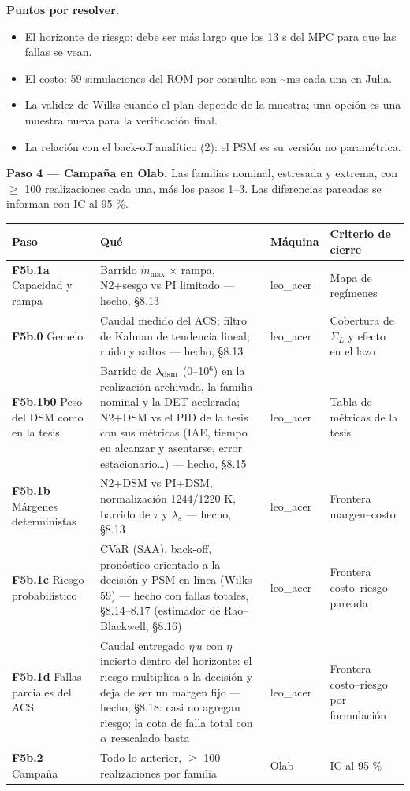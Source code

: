\documentclass[11pt,a4paper]{article}
\begin{document}
\textbf{Puntos por resolver.}

\begin{itemize}
\item El horizonte de riesgo: debe ser más largo que los 13 s del MPC para que las fallas se vean.
\item El costo: 59 simulaciones del ROM por consulta son \textasciitilde{}ms cada una en Julia.
\item La validez de Wilks cuando el plan depende de la muestra; una opción es una muestra nueva para la verificación final.
\item La relación con el back-off analítico (2): el PSM es su versión no paramétrica.
\end{itemize}

\textbf{Paso 4 — Campaña en Olab.} Las familias nominal, estresada y extrema, con $\ge$ 100 realizaciones cada una, más los pasos 1–3. Las diferencias pareadas se informan con IC al 95 \%.

{\footnotesize
\begin{xltabular}{\linewidth}{@{}YYYY@{}}
\toprule
\textbf{Paso} & \textbf{Qué} & \textbf{Máquina} & \textbf{Criterio de cierre} \\
\midrule
\endhead
\textbf{F5b.1a} Capacidad y rampa & Barrido $\dot m_{\max}$ $\times$ rampa, N2+sesgo vs PI limitado — hecho, \S{}8.13 & leo\_acer & Mapa de regímenes \\
\textbf{F5b.0} Gemelo & Caudal medido del ACS; filtro de Kalman de tendencia lineal; ruido y saltos — hecho, \S{}8.13 & leo\_acer & Cobertura de $\Sigma_L$ y efecto en el lazo \\
\textbf{F5b.1b0} Peso del DSM como en la tesis & Barrido de $\lambda_{\rm dsm}$ (0–10$^{6}$) en la realización archivada, la familia nominal y la DET acelerada; N2+DSM vs el PID de la tesis con sus métricas (IAE, tiempo en alcanzar y asentarse, error estacionario\ldots{}) — hecho, \S{}8.15 & leo\_acer & Tabla de métricas de la tesis \\
\textbf{F5b.1b} Márgenes deterministas & N2+DSM vs PI+DSM, normalización 1244/1220 K, barrido de $\tau$ y $\lambda_s$ — hecho, \S{}8.13 & leo\_acer & Frontera margen–costo \\
\textbf{F5b.1c} Riesgo probabilístico & CVaR (SAA), back-off, pronóstico orientado a la decisión y PSM en línea (Wilks 59) — hecho con fallas totales, \S{}8.14–8.17 (estimador de Rao–Blackwell, \S{}8.16) & leo\_acer & Frontera costo–riesgo pareada \\
\textbf{F5b.1d} Fallas parciales del ACS & Caudal entregado $\eta\,u$ con $\eta$ incierto dentro del horizonte: el riesgo multiplica a la decisión y deja de ser un margen fijo — hecho, \S{}8.18: casi no agregan riesgo; la cota de falla total con $\alpha$ reescalado basta & leo\_acer & Frontera costo–riesgo por formulación \\
\textbf{F5b.2} Campaña & Todo lo anterior, $\ge$ 100 realizaciones por familia & Olab & IC al 95 \% \\
\bottomrule
\end{xltabular}}
\end{document}
